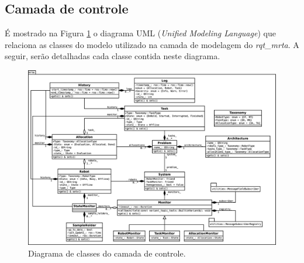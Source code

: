             
            
        \subsection{Camada de controle} \label{subset:rqt_mrta_controller}
            
            É mostrado na Figura \ref{fig:rqt_mrta_controller_uml} o diagrama UML (\textit{Unified Modeling Language}) que relaciona as classes do modelo utilizado na camada de modelagem do \textit{rqt\_mrta}. A seguir, serão detalhadas cada classe contida neste diagrama.
            
            \begin{figure}[p]
                \centering
                \includegraphics[height=\textwidth,angle=90]{Figuras/3_desenvolvimento/rqt_mrta_controller_uml.eps}
                \caption{Diagrama de classes do camada de controle.} \label{fig:rqt_mrta_controller_uml}
            \end{figure}
            

